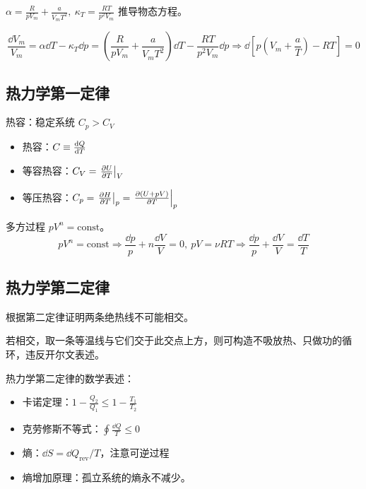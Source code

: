 \begin{framed}
    $\alpha = \frac{R}{p V_m} + \frac{a}{V_m T^2},\ \kappa_T = \frac{R T}{p^2 V_m}$ 推导物态方程。

    \[
        \frac{\dd{V_m}}{V_m} = \alpha \dd{T} - \kappa_T \dd{p} = (\frac{R}{p V_m} + \frac{a}{V_m T^2}) \dd{T} - \frac{R T}{p^2 V_m} \dd{p} \Rightarrow \dd{\left[p \left(V_m + \frac{a}{T}\right) - R T\right]} = 0
    \]
\end{framed}

\subsection{热力学第一定律}

热容：稳定系统 $C_p > C_V$

\begin{itemize}
    \item 热容：$C \equiv \dv{Q}{T}$
    \item 等容热容：$C_V = \left.\pdv{U}{T}\right|_V$
    \item 等压热容：$C_p = \left.\pdv{H}{T}\right|_p = \left.\pdv{(U + pV)}{T}\right|_p$
\end{itemize}

\begin{framed}
    多方过程 $p V^n = \text{const}$。
    \[
        p V^n = \text{const} \Rightarrow \frac{\dd{p}}{p} + n \frac{\dd{V}}{V} = 0,\ p V = \nu R T \Rightarrow \frac{\dd{p}}{p} + \frac{\dd{V}}{V} = \frac{\dd{T}}{T}
    \]
\end{framed}



\subsection{热力学第二定律}

\begin{framed}
    根据第二定律证明两条绝热线不可能相交。

    若相交，取一条等温线与它们交于此交点上方，则可构造不吸放热、只做功的循环，违反开尔文表述。
\end{framed}

热力学第二定律的数学表述：
\begin{itemize}
    \item 卡诺定理：$1 - \frac{Q_2}{Q_1} \leq 1 - \frac{T_1}{T_2}$
    \item 克劳修斯不等式：$\oint \frac{\dd{Q}}{T} \leq 0$
    \item 熵：$\dd{S} = \dd{Q_{\text{rev}}} / T$，注意可逆过程
    \item 熵增加原理：孤立系统的熵永不减少。
\end{itemize}

